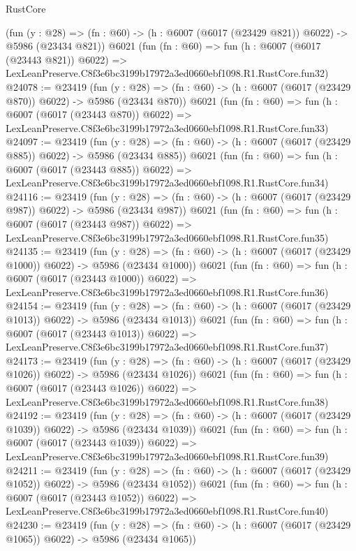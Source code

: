 \begin{lexlean}{RustCore}
\begin{coremodule}
    (fun (y : @28) => (fn : @60) -> (h : @6007 (@6017 (@23429 @821)) @6022) -> @5986 (@23434 @821))
    @6021
    (fun (fn : @60) =>
    fun (h : @6007 (@6017 (@23443 @821)) @6022) =>
    LexLeanPreserve.C8f3e6bc3199b17972a3ed0660ebf1098.R1.RustCore.fun32)
@24078 := @23419
    (fun (y : @28) => (fn : @60) -> (h : @6007 (@6017 (@23429 @870)) @6022) -> @5986 (@23434 @870))
    @6021
    (fun (fn : @60) =>
    fun (h : @6007 (@6017 (@23443 @870)) @6022) =>
    LexLeanPreserve.C8f3e6bc3199b17972a3ed0660ebf1098.R1.RustCore.fun33)
@24097 := @23419
    (fun (y : @28) => (fn : @60) -> (h : @6007 (@6017 (@23429 @885)) @6022) -> @5986 (@23434 @885))
    @6021
    (fun (fn : @60) =>
    fun (h : @6007 (@6017 (@23443 @885)) @6022) =>
    LexLeanPreserve.C8f3e6bc3199b17972a3ed0660ebf1098.R1.RustCore.fun34)
@24116 := @23419
    (fun (y : @28) => (fn : @60) -> (h : @6007 (@6017 (@23429 @987)) @6022) -> @5986 (@23434 @987))
    @6021
    (fun (fn : @60) =>
    fun (h : @6007 (@6017 (@23443 @987)) @6022) =>
    LexLeanPreserve.C8f3e6bc3199b17972a3ed0660ebf1098.R1.RustCore.fun35)
@24135 := @23419
    (fun (y : @28) =>
    (fn : @60) -> (h : @6007 (@6017 (@23429 @1000)) @6022) -> @5986 (@23434 @1000))
    @6021
    (fun (fn : @60) =>
    fun (h : @6007 (@6017 (@23443 @1000)) @6022) =>
    LexLeanPreserve.C8f3e6bc3199b17972a3ed0660ebf1098.R1.RustCore.fun36)
@24154 := @23419
    (fun (y : @28) =>
    (fn : @60) -> (h : @6007 (@6017 (@23429 @1013)) @6022) -> @5986 (@23434 @1013))
    @6021
    (fun (fn : @60) =>
    fun (h : @6007 (@6017 (@23443 @1013)) @6022) =>
    LexLeanPreserve.C8f3e6bc3199b17972a3ed0660ebf1098.R1.RustCore.fun37)
@24173 := @23419
    (fun (y : @28) =>
    (fn : @60) -> (h : @6007 (@6017 (@23429 @1026)) @6022) -> @5986 (@23434 @1026))
    @6021
    (fun (fn : @60) =>
    fun (h : @6007 (@6017 (@23443 @1026)) @6022) =>
    LexLeanPreserve.C8f3e6bc3199b17972a3ed0660ebf1098.R1.RustCore.fun38)
@24192 := @23419
    (fun (y : @28) =>
    (fn : @60) -> (h : @6007 (@6017 (@23429 @1039)) @6022) -> @5986 (@23434 @1039))
    @6021
    (fun (fn : @60) =>
    fun (h : @6007 (@6017 (@23443 @1039)) @6022) =>
    LexLeanPreserve.C8f3e6bc3199b17972a3ed0660ebf1098.R1.RustCore.fun39)
@24211 := @23419
    (fun (y : @28) =>
    (fn : @60) -> (h : @6007 (@6017 (@23429 @1052)) @6022) -> @5986 (@23434 @1052))
    @6021
    (fun (fn : @60) =>
    fun (h : @6007 (@6017 (@23443 @1052)) @6022) =>
    LexLeanPreserve.C8f3e6bc3199b17972a3ed0660ebf1098.R1.RustCore.fun40)
@24230 := @23419
    (fun (y : @28) =>
    (fn : @60) -> (h : @6007 (@6017 (@23429 @1065)) @6022) -> @5986 (@23434 @1065))

\end{coremodule}
\end{lexlean}

